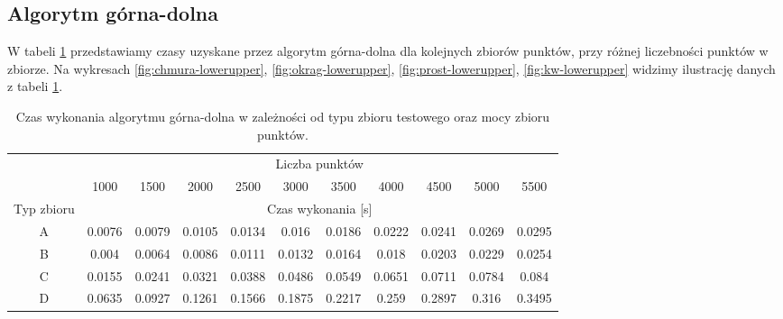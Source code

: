 \documentclass[11pt]{article}
\theoremstyle{remark} \newtheorem{definition}{def.}
\theoremstyle{definition} \newtheorem{twierdzenie}{tw.}
\begin{document}
\subsection{Algorytm górna-dolna}

W tabeli \ref{tab:lowerupper} przedstawiamy czasy uzyskane przez algorytm górna-dolna dla kolejnych zbiorów punktów, przy różnej liczebności punktów w zbiorze. Na wykresach \ref{fig:chmura-lowerupper}, 
\ref{fig:okrag-lowerupper}, \ref{fig:prost-lowerupper}, \ref{fig:kw-lowerupper} widzimy ilustrację danych z tabeli \ref{tab:lowerupper}.

\begin{table}[]
\centering
\caption{Czas wykonania algorytmu górna-dolna w zależności od typu zbioru testowego oraz mocy zbioru punktów.}
\label{tab:lowerupper}
\begin{tabular}{c|c|c|c|c|c|c|c|c|c|c|}
\cline{2-11}
\multicolumn{1}{l|}{} & \multicolumn{10}{c|}{Liczba punktów} \\ \cline{2-11} 
\multicolumn{1}{l|}{} & 1000 & 1500 & 2000 & 2500 & 3000 & 3500 & 4000 & 4500 & 5000 & 5500 \\ \hline
\multicolumn{1}{|c|}{Typ zbioru} & \multicolumn{10}{c|}{Czas wykonania [s]} \\ \hline
\multicolumn{1}{|c|}{A} & 0.0076 & 0.0079 & 0.0105 & 0.0134 & 0.016 & 0.0186 & 0.0222 & 0.0241 & 0.0269 & 0.0295 \\ \hline
\multicolumn{1}{|c|}{B} & 0.004 & 0.0064 & 0.0086 & 0.0111 & 0.0132 & 0.0164 & 0.018 & 0.0203 & 0.0229 & 0.0254 \\ \hline
\multicolumn{1}{|c|}{C} & 0.0155 & 0.0241 & 0.0321 & 0.0388 & 0.0486 & 0.0549 & 0.0651 & 0.0711 & 0.0784 & 0.084 \\ \hline
\multicolumn{1}{|c|}{D} & 0.0635 & 0.0927 & 0.1261 & 0.1566 & 0.1875 & 0.2217 & 0.259 & 0.2897 & 0.316 & 0.3495 \\ \hline
\end{tabular}
\end{table}
\end{document}
